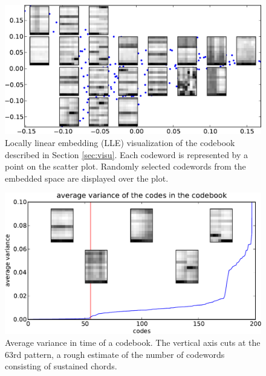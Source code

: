 \documentclass{article}
\begin{document}
\begin{figure}[htb]
\begin{center}
\includegraphics[width=.9\columnwidth]{codes_lle}
\end{center}
\caption{\small{ Locally linear embedding (LLE) visualization of the
    codebook described in Section \ref{sec:visu}.  Each codeword is
    represented by a point on the scatter plot.  Randomly selected
    codewords from the embedded space are displayed over the plot.
  }}
\label{fig:lle}
\end{figure}

\begin{figure}[htb]
\begin{center}
\includegraphics[width=.9\columnwidth]{code_variance}
\end{center}
\caption{\small{Average variance in time of a codebook. The vertical
axis cuts at the $63$rd pattern, a rough estimate of the number of 
codewords consisting of sustained chords.
}}
\label{fig:code_var}
\end{figure}
\end{document}
